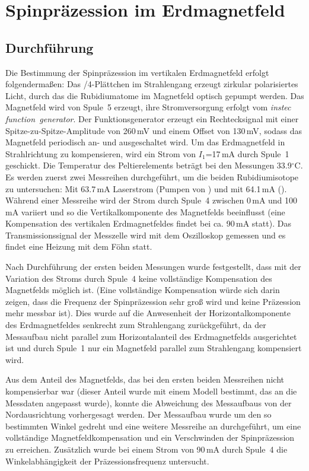 \section{Spinpräzession im Erdmagnetfeld}
\subsection{Durchführung}
Die Bestimmung der Spinpräzession im vertikalen Erdmagnetfeld erfolgt folgendermaßen:
Das \textlambda/4-Plättchen im Strahlengang erzeugt zirkular polarisiertes Licht,
durch das die Rubidiumatome im Magnetfeld optisch gepumpt werden.
Das Magnetfeld wird von Spule~5 erzeugt, ihre Stromversorgung erfolgt vom \emph{instec function~generator}.
Der Funktionsgenerator erzeugt ein Rechtecksignal mit einer Spitze-zu-Spitze-Amplitude von 260\,mV und
einem Offset von 130\,mV, sodass das Magnetfeld periodisch an- und ausgeschaltet wird.
Um das Erdmagnetfeld in Strahlrichtung zu kompensieren,
wird ein Strom von $I_1$=17\,mA durch Spule~1 geschickt.
Die Temperatur des Peltierelements beträgt bei den Messungen 33.9$^\circ$C.
Es werden zuerst zwei Messreihen durchgeführt, um die beiden Rubidiumisotope zu untersuchen:
Mit 63.7\,mA Laserstrom (Pumpen von ) und mit 64.1\,mA ().
Während einer Messreihe wird der Strom durch Spule~4 zwischen 0\,mA und 100\,mA variiert und
so die Vertikalkomponente des Magnetfelds beeinflusst
(eine Kompensation des vertikalen Erdmagnetfeldes findet bei ca. 90\,mA statt).
Das Transmissionssignal der Messzelle wird mit dem Oszilloskop gemessen und
es findet eine Heizung mit dem Föhn statt.

Nach Durchführung der ersten beiden Messungen wurde festgestellt,
dass mit der Variation des Stroms durch Spule~4 keine vollständige Kompensation des Magnetfelds möglich ist.
(Eine vollständige Kompensation würde sich darin zeigen,
dass die Frequenz der Spinpräzession sehr groß wird und keine Präzession mehr messbar ist).
Dies wurde auf die Anwesenheit der Horizontalkomponente des Erdmagnetfeldes
senkrecht zum Strahlengang zurückgeführt, da der Messaufbau nicht parallel zum Horizontalanteil des
Erdmagnetfelds ausgerichtet ist und durch Spule~1 nur ein Magnetfeld parallel zum Strahlengang kompensiert wird.

Aus dem Anteil des Magnetfelds, das bei den ersten beiden Messreihen nicht kompensierbar war
(dieser Anteil wurde mit einem Modell bestimmt, das an die Messdaten angepasst wurde),
konnte die Abweichung des Messaufbaus von der Nordausrichtung vorhergesagt werden.
Der Messaufbau wurde um den so bestimmten Winkel gedreht und eine weitere Messreihe an  durchgeführt,
um eine vollständige Magnetfeldkompensation und ein Verschwinden der Spinpräzession zu erreichen.
Zusätzlich wurde bei einem Strom von 90\,mA durch Spule~4 die Winkelabhängigkeit der Präzessionsfrequenz untersucht.


